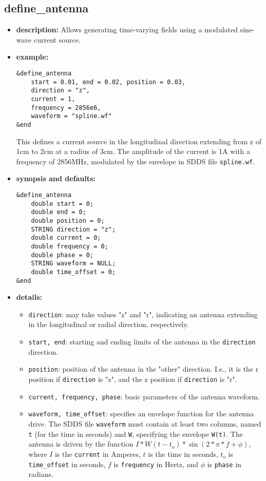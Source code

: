 %
\newpage

\subsection{define\_antenna}

\begin{itemize}

\item {\bf description:}
Allows generating time-varying fields using a modulated sine-wave current
source.

\item {\bf example:} 
\begin{verbatim}
&define_antenna
    start = 0.01, end = 0.02, position = 0.03,
    direction = "z",
    current = 1,
    frequency = 2856e6,
    waveform = "spline.wf"
&end
\end{verbatim}
This defines a current source in the longitudinal direction extending from
z of 1cm to 2cm at a radius of 3cm.  The amplitude of the current is
1A with a frequency of 2856MHz, modulated by the envelope in SDDS file
{\tt spline.wf}.

\item {\bf synopsis and defaults:} 
\begin{verbatim}
&define_antenna
    double start = 0;
    double end = 0;
    double position = 0;
    STRING direction = "z";
    double current = 0;
    double frequency = 0;
    double phase = 0;
    STRING waveform = NULL;
    double time_offset = 0;
&end
\end{verbatim}

\item {\bf details:} 

\begin{itemize}
\item {\tt direction}: may take values "z" and "r", indicating an antenna extending
        in the longitudinal or radial direction, respectively.
\item {\tt start, end}:  starting and ending limits of the antenna in the 
        {\tt direction} direction.
\item {\tt position}: position of the antenna in the "other" direction.  I.e., it is
        the r position if {\tt direction} is "z", and the z position if {\tt direction}
        is "r".
\item {\tt current, frequency, phase}: basic parameters of the antenna waveform.
\item {\tt waveform, time\_offset}: specifies an envelope function for the antenna drive.
The SDDS file {\tt waveform} must contain at least two columns, named {\tt t} (for the
time in seconds) and {\tt W}, specifying the envelope {\tt W(t)}.  The antenna is
driven by the function
$ I*W(t-t_o)*\sin(2*\pi*f+\phi) $, where $I$ is the {\tt current} in Amperes, 
$t$ is the time in seconds, $t_o$ is {\tt time\_offset} in seconds, $f$ is
{\tt frequency} in Hertz, and $\phi$ is {\tt phase} in radians.

\end{itemize}

\end{itemize}
